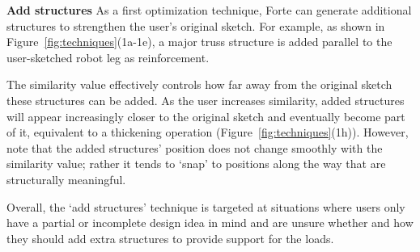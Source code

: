 
\textbf{Add structures} \hspace{0.1cm} As a first optimization technique, Forte can generate additional structures to strengthen the user's original sketch. For example, as shown in Figure~\ref{fig:techniques}(1a-1e), a major truss structure is added parallel to the user-sketched robot leg as reinforcement. 


The similarity value effectively controls how far away from the original sketch these structures can be added. As the user increases similarity, added structures will appear increasingly closer to the original sketch and eventually become part of it, equivalent to a thickening operation (Figure~\ref{fig:techniques}(1h)). However, note that the added structures' position does not change smoothly with the similarity value; rather it tends to `snap' to positions along the way that are structurally meaningful. 

Overall, the `add structures' technique is targeted at situations where users only have a partial or incomplete design idea in mind and are unsure whether and how they should add extra structures to provide support for the loads.


